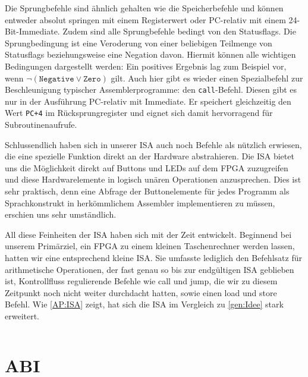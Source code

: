Die Sprungbefehle sind ähnlich gehalten wie die Speicherbefehle und
können entweder absolut springen mit einem Registerwert oder PC-relativ mit einem 24-Bit-Immediate.
Zudem sind alle Sprungbefehle bedingt von den Statusflags.
Die Sprungbedingung ist eine Veroderung von einer beliebigen Teilmenge von Statusflags beziehungsweise eine Negation davon.
Hiermit können alle wichtigen Bedingungen dargestellt werden:
Ein positives Ergebnis lag zum Beispiel vor, wenn $\neg (\texttt{Negative} \lor \texttt{Zero})$ gilt.
Auch hier gibt es wieder einen Spezialbefehl zur Beschleunigung typischer Assemblerprogramme: den \texttt{call}-Befehl.
Diesen gibt es nur in der Ausführung PC-relativ mit Immediate.
Er speichert gleichzeitig den Wert \texttt{PC+4} im Rücksprungregister und
eignet sich damit hervorragend für Subroutinenaufrufe.

Schlussendlich haben sich in unserer ISA auch noch Befehle als nützlich erwiesen, die eine spezielle Funktion direkt an der Hardware abstrahieren. Die ISA bietet uns die Möglichkeit direkt auf Buttons und LEDs auf dem FPGA zuzugreifen und diese Hardwarelemente in logisch unären Operationen anzusprechen. Dies ist sehr praktisch, denn eine Abfrage der Buttonelemente für jedes Programm als Sprachkonstrukt in herkömmlichem Assembler implementieren zu müssen, erschien uns sehr umständlich.

All diese Feinheiten der ISA haben sich mit der Zeit entwickelt. Beginnend bei unserem Primärziel, ein FPGA zu einem kleinen Taschenrechner werden lassen, hatten wir eine entsprechend kleine ISA. Sie umfasste lediglich den Befehlsatz für arithmetische Operationen, der fast genau so bis zur endgültigen ISA geblieben ist, Kontrollfluss regulierende Befehle wie call und jump, die wir zu diesem Zeitpunkt noch nicht weiter durchdacht hatten, sowie einen load und store Befehl. Wie \autoref{AP:ISA} zeigt, hat sich die ISA im Vergleich zu \autoref{gen:Idee} stark erweitert. 

\newpage
\begin{multicols}{3}
\inputminted{nasm}{calc.s}
\end{multicols}



\section{ABI}

